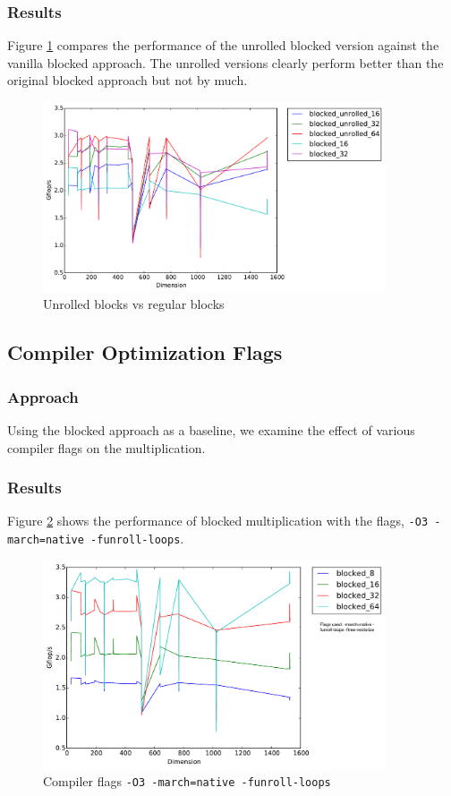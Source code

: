 \documentclass[11pt]{article}
\theoremstyle{plain}
\theoremstyle{definition}
\begin{document}
\subsubsection{Results}
Figure \ref{unrolled_vs_regular} compares the performance of the unrolled blocked version against the vanilla blocked approach. The unrolled versions clearly perform better than the original blocked approach but not by much. 
\begin{figure}[H]
    \includegraphics[width=0.9\textwidth]{timing_unrolled_vs_nonunrolled.pdf}
    \caption{Unrolled blocks vs regular blocks}
    \label{unrolled_vs_regular}
\end{figure} 

\subsection{Compiler Optimization Flags}
\subsubsection{Approach}
Using the blocked approach as a baseline, we examine the effect of various compiler flags on the multiplication.
\subsubsection{Results}
Figure \ref{all_optimized_blocked} shows the performance of blocked multiplication with the flags, \texttt{-O3 -march=native -funroll-loops}.
\begin{figure}[H]
    \includegraphics[width=0.9\textwidth]{timing_flags_blocked.pdf}
    \caption{Compiler flags \texttt{-O3 -march=native -funroll-loops}}
    \label{all_optimized_blocked}
\end{figure} 
\end{document}
